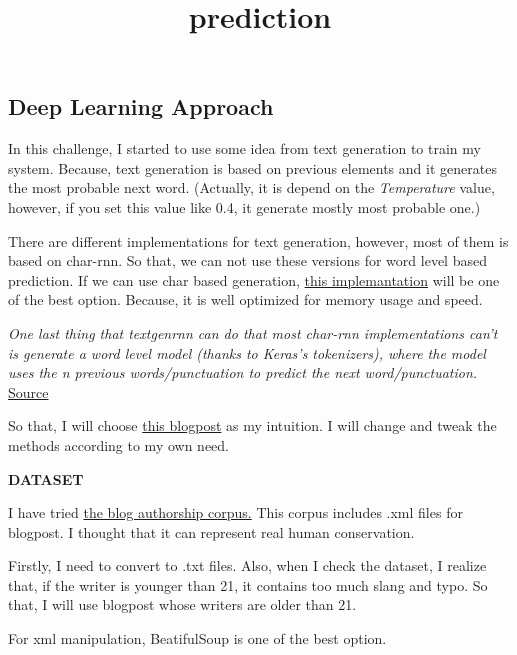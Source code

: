 \documentclass[11pt]{article}
\title{prediction}
\begin{document}
    
    
    \maketitle
    
    

    
    \subsection{Deep Learning Approach}\label{deep-learning-approach}

In this challenge, I started to use some idea from text generation to
train my system. Because, text generation is based on previous elements
and it generates the most probable next word. (Actually, it is depend on
the \emph{Temperature} value, however, if you set this value like 0.4,
it generate mostly most probable one.)

There are different implementations for text generation, however, most
of them is based on char-rnn. So that, we can not use these versions for
word level based prediction. If we can use char based generation,
\href{https://github.com/minimaxir/textgenrnn}{this implemantation} will
be one of the best option. Because, it is well optimized for memory
usage and speed.

\emph{One last thing that textgenrnn can do that most char-rnn
implementations can't is generate a word level model (thanks to Keras's
tokenizers), where the model uses the n previous words/punctuation to
predict the next word/punctuation.}
\href{https://minimaxir.com/2018/05/text-neural-networks/}{Source}

So that, I will choose
\href{https://medium.com/@david.campion/text-generation-using-bidirectional-lstm-and-doc2vec-models-1-3-8979eb65cb3a}{this
blogpost} as my intuition. I will change and tweak the methods according
to my own need.

    \textbf{DATASET}

I have tried \href{http://u.cs.biu.ac.il/~koppel/BlogCorpus.htm}{the
blog authorship corpus.} This corpus includes .xml files for blogpost. I
thought that it can represent real human conservation.

Firstly, I need to convert to .txt files. Also, when I check the
dataset, I realize that, if the writer is younger than 21, it contains
too much slang and typo. So that, I will use blogpost whose writers are
older than 21.

For xml manipulation, BeatifulSoup is one of the best option.
\end{document}
